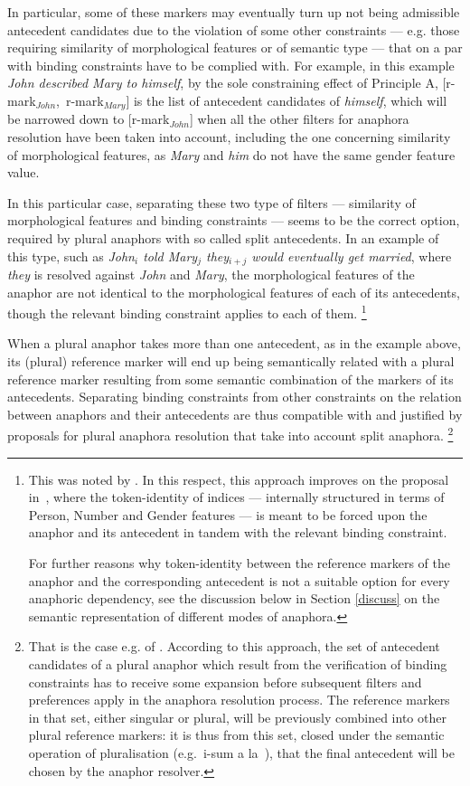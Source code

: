 \documentclass[output=paper
	        ,collection
	        ,collectionchapter
 	        ,biblatex
                ,babelshorthands
                ,newtxmath
                ,draftmode
                ,colorlinks, citecolor=brown
]{langscibook}
\begin{document}
In particular, some of these markers 
may eventually turn up not being admissible antecedent candidates due to the violation of some
other constraints --- e.g. those requiring similarity of morphological features
or of semantic type --- that on a par with binding constraints
have to be complied with. For example, in this example {\it John described Mary to himself}, by the sole
constraining effect of Principle A, \mbox{[r-mark$_{John}$, r-mark$_{Mary}$]} 
is the list of antecedent candidates of
{\it himself}, which will be narrowed down to [r-mark$_{John}$] when all the other
filters for anaphora resolution have been taken into account, including
the one concerning similarity of morphological features,
as {\it Mary} and {\it him} do not have the same gender feature value.

In this particular case, separating these two type of filters --- similarity of
morphological features and binding constraints --- seems to be the correct
option, required by plural anaphors with so called split antecedents. In an example 
of this type, such as {\it John$_{i}$ told Mary$_{j}$ they$_{i+j}$ would eventually get
married}, where {\it they} is resolved against {\it John} and {\it Mary}, the
morphological features of the anaphor are not identical to the morphological
features of each of its antecedents, though the relevant binding constraint
applies to each of them.%
%
\footnote{This was noted by \citep{higg:split83}. In this respect, this approach improves on the proposal in~\citep{polsag:hpsg94},
where the token-identity of indices --- internally structured in
terms of Person, Number and Gender features --- is meant to be
forced upon the anaphor and its antecedent in tandem with the relevant binding
constraint. 

For further reasons why token-identity between
the reference markers of the anaphor and the corresponding antecedent
is not a suitable option for every anaphoric dependency,
see the discussion below in Section \ref{discuss}
on the semantic representation of different modes of anaphora.}
% 


When a plural anaphor takes more than one antecedent, as in the example above, 
its (plural) reference marker will end up being semantically related with a
plural reference marker resulting from some semantic combination
of the markers of its antecedents. Separating binding constraints from
other constraints on the relation between anaphors and their antecedents
are thus compatible with and justified by proposals for plural anaphora 
resolution that take into account split anaphora.%
%
\footnote{
That is the case e.g. of \citep{eschen:plural89}. According to this approach, the set of antecedent candidates of 
a plural anaphor which result from the verification of
binding constraints has to receive some expansion before subsequent 
filters and preferences apply in the anaphora resolution process. The reference
markers in that set, either singular or plural, will be 
previously combined into other plural reference markers: it is thus
from this set, closed under the semantic operation of 
pluralisation (e.g.\ i-sum a la~\citep{link:isums83}),
that the final antecedent will be chosen by the anaphor resolver.
}
\end{document}
